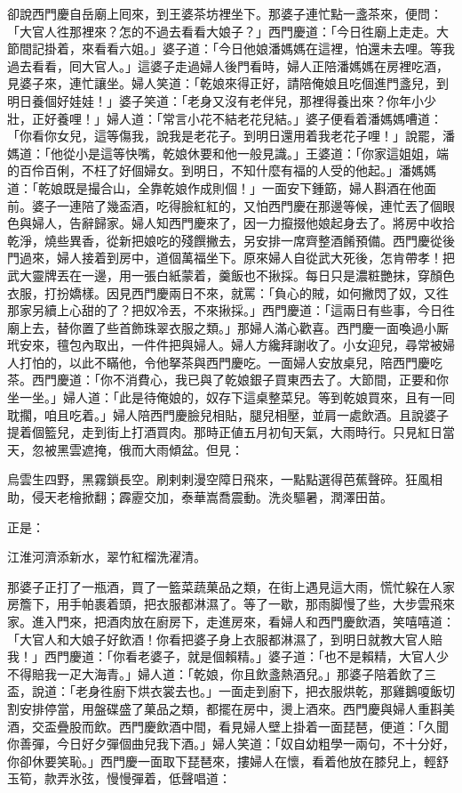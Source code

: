 卻說西門慶自岳廟上囘來，到王婆茶坊裡坐下。那婆子連忙點一盞茶來，便問：「大官人徃那裡來？怎的不過去看看大娘子？」西門慶道：「今日徃廟上走走。大節間記掛着，來看看六姐。」婆子道：「今日他娘潘媽媽在這裡，怕還未去哩。等我過去看看，囘大官人。」這婆子走過婦人後門看時，婦人正陪潘媽媽在房裡吃酒，見婆子來，連忙讓坐。婦人笑道：「乾娘來得正好，請陪俺娘且吃個進門盞兒，到明日養個好娃娃！」婆子笑道：「老身又沒有老伴兒，那裡得養出來？你年小少壯，正好養哩！」婦人道：「常言小花不結老花兒結。」婆子便看着潘媽媽嘈道：「你看你女兒，這等傷我，說我是老花子。到明日還用着我老花子哩！」{}說罷，潘媽道：「他從小是這等快嘴，乾娘休要和他一般見識。」王婆道：「你家這姐姐，端的百伶百俐，不枉了好個婦女。到明日，不知什麼有福的人受的他起。」潘媽媽道：「乾娘既是撮合山，全靠乾娘作成則個！」一面安下鍾筯，婦人斟酒在他面前。婆子一連陪了幾盃酒，吃得臉紅紅的，又怕西門慶在那邊等候，連忙丟了個眼色與婦人，告辭歸家。婦人知西門慶來了，因一力攛掇他娘起身去了。將房中收拾乾淨，燒些異香，從新把娘吃的殘饌撇去，另安排一席齊整酒餚預備。西門慶從後門過來，婦人接着到房中，道個萬福坐下。原來婦人自從武大死後，怎肯帶孝！把武大靈牌丟在一邊，{}用一張白紙蒙着，羹飯也不揪採。每日只是濃粧艷抹，穿顏色衣服，打扮嬌樣。因見西門慶兩日不來，就罵：「負心的賊，如何撇閃了奴，又徃那家另續上心甜的了？把奴冷丟，不來揪採。」西門慶道：「這兩日有些事，今日徃廟上去，替你置了些首飾珠翠衣服之類。」那婦人滿心歡喜。西門慶一面喚過小厮玳安來，氊包內取出，一件件把與婦人。婦人方纔拜謝收了。小女迎兒，尋常被婦人打怕的，以此不瞞他，令他拏茶與西門慶吃。一面婦人安放桌兒，陪西門慶吃茶。西門慶道：「你不消費心，我已與了乾娘銀子買東西去了。大節間，正要和你坐一坐。」婦人道：「此是待俺娘的，奴存下這桌整菜兒。等到乾娘買來，且有一囘耽擱，咱且吃着。」婦人陪西門慶臉兒相貼，腿兒相壓，並肩一處飲酒。且說婆子提着個籃兒，走到街上打酒買肉。那時正値五月初旬天氣，大雨時行。只見紅日當天，忽被黑雲遮掩，俄而大雨傾盆。但見：

\begin{myquote} 
烏雲生四野，黑霧鎖長空。刷剌剌漫空障日飛來，一點點選得芭蕉聲碎。狂風相助，侵天老檜掀翻；霹靂交加，泰華嵩喬震動。洗炎驅暑，潤澤田苗。
\end{myquote} 

正是：

\begin{myquote} 
江淮河濟添新水，翠竹紅榴洗濯清。
\end{myquote} 

那婆子正打了一瓶酒，買了一籃菜蔬菓品之類，在街上遇見這大雨，慌忙躱在人家房簷下，用手帕裹着頭，把衣服都淋濕了。等了一歇，那雨脚慢了些，大步雲飛來家。進入門來，把酒肉放在廚房下，走進房來，看婦人和西門慶飲酒，笑嘻嘻道：「大官人和大娘子好飲酒！你看把婆子身上衣服都淋濕了，到明日就教大官人賠我！」西門慶道：「你看老婆子，就是個賴精。」婆子道：「也不是賴精，大官人少不得賠我一疋大海青。」婦人道：「乾娘，你且飲盞熱酒兒。」那婆子陪着飲了三盃，說道：「老身徃廚下烘衣裳去也。」一面走到廚下，把衣服烘乾，那雞鵝嗄飯切割安排停當，用盤碟盛了菓品之類，都擺在房中，燙上酒來。西門慶與婦人重斟美酒，交盃疊股而飲。西門慶飲酒中間，看見婦人壁上掛着一面琵琶，便道：「久聞你善彈，今日好夕彈個曲兒我下酒。」婦人笑道：「奴自幼粗學一兩句，不十分好，你卻休要笑恥。」西門慶一面取下琵琶來，摟婦人在懷，看着他放在膝兒上，輕舒玉筍，款弄氷弦，慢慢彈着，低聲唱道：

